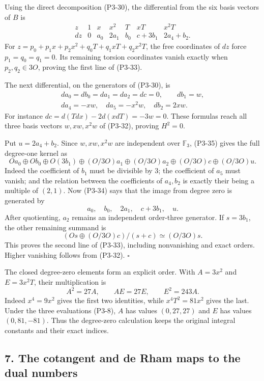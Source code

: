\documentclass[
  10pt,
]{article}
\begin{document}
Using the direct decomposition (P3-30), the differential from the six
basis vectors of \(B\) is \[
\begin{array}{c|rrrrrr}
z&1&x&x^2&T&xT&x^2T\\ \hline
dz&0&a_0&2a_1&b_0&c+3b_1&2a_4+b_2.
\end{array}
\tag{P3-34}
\] For \(z=p_0+p_1x+p_2x^2+q_0T+q_1xT+q_2x^2T\), the free coordinates of
\(dz\) force \(p_1=q_0=q_1=0\). Its remaining torsion coordinates vanish
exactly when \(p_2,q_2\in3O\), proving the first line of (P3-33).

The next differential, on the generators of (P3-30), is \[
\begin{gathered}
da_0=db_0=da_1=da_2=dc=0,\qquad db_1=w,\\
da_4=-xw,\quad da_5=-x^2w,\quad db_2=2xw.
\end{gathered}
\tag{P3-35}
\] For instance \(dc=d(Tdx)-2d(xdT)=-3w=0\). These formulas reach all
three basis vectors \(w,xw,x^2w\) of (P3-32), proving \(H^2=0\).

Put \(u=2a_4+b_2\). Since \(w,xw,x^2w\) are independent over
\(\mathbb F_3\), (P3-35) gives the full degree-one kernel as \[
Oa_0\oplus Ob_0\oplus O(3b_1)
\oplus(O/3O)a_1\oplus(O/3O)a_2
\oplus(O/3O)c\oplus(O/3O)u.
\tag{P3-36}
\] Indeed the coefficient of \(b_1\) must be divisible by 3; the
coefficient of \(a_5\) must vanish; and the relation between the
coefficients of \(a_4,b_2\) is exactly their being a multiple of
\((2,1)\). Now (P3-34) says that the image from degree zero is generated
by \[
a_0,\quad b_0,\quad 2a_1,\quad c+3b_1,\quad u.
\] After quotienting, \(a_2\) remains an independent order-three
generator. If \(s=3b_1\), the other remaining summand is \[
(Os\oplus(O/3O)c)/(s+c)\simeq(O/3O)s.
\] This proves the second line of (P3-33), including nonvanishing and
exact orders. Higher vanishing follows from (P3-32). \(\square\)

The closed degree-zero elements form an explicit order. With \(A=3x^2\)
and \(E=3x^2T\), their multiplication is \[
A^2=27A,\qquad AE=27E,\qquad E^2=243A.
\tag{P3-37}
\] Indeed \(x^4=9x^2\) gives the first two identities, while
\(x^4T^2=81x^2\) gives the last. Under the three evaluations (P3-8),
\(A\) has values \((0,27,27)\) and \(E\) has values \((0,81,-81)\). Thus
the degree-zero calculation keeps the original integral constants and
their exact indices.

\subsection{7. The cotangent and de Rham maps to the dual
numbers}\label{the-cotangent-and-de-rham-maps-to-the-dual-numbers}
\end{document}
